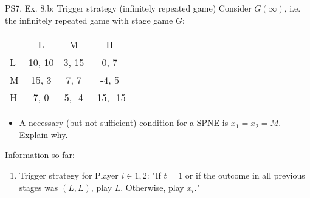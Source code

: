 \begin{frame}{PS7, Ex. 8.b: Trigger strategy (infinitely repeated game)}
    Consider $G(\infty)$, i.e. the infinitely repeated game with stage game $G$: \vspace{-6pt}
    \begin{table}
      \begin{tabular}{l|c|c|c|}
        \multicolumn{1}{c}{} & \multicolumn{1}{c}{L} & \multicolumn{1}{c}{M} & \multicolumn{1}{c}{H} \\\cline{2-4}
        L & 10, 10 & 3, 15 & 0, 7 \\\cline{2-4}
        M & 15, 3 & 7, 7 & -4, 5 \\\cline{2-4}
        H & 7, 0 & 5, -4 & -15, -15 \\\cline{2-4}
      \end{tabular}
    \end{table}
    \begin{itemize}
      \item[(b)] A necessary (but not sufficient) condition for a SPNE is $x_1 = x_2 = M$. Explain why.
    \end{itemize}
    \begin{multicols}{2}
      \vfill\null\columnbreak
      Information so far:
      \begin{enumerate}
        \item Trigger strategy for Player $i\in1,2$: "If $t=1$ or if the outcome in all previous stages was $(L,L)$, play $L$. Otherwise, play $x_i$."
      \end{enumerate}
      \vfill\null
    \end{multicols}
\end{frame}
